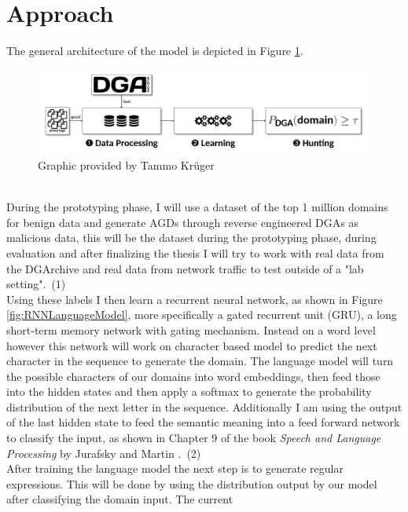 \documentclass[a4paper, 12pt]{article}
\begin{document}
\section{Approach}
The general architecture of the model is depicted in Figure \ref{fig:architecture}. 
\begin{figure}[h]
    \includegraphics[width=\textwidth]{images/DGA_Detect_Architecture.png}
    \caption{Graphic provided by Tammo Kr\"uger}
    \label{fig:architecture}
\end{figure}\\
During the prototyping phase, I will use a dataset of the top 1 million domains
\cite{noauthor_cisco_nodate} for benign data and
generate AGDs through reverse engineered DGAs \cite{bader_baderjdomain_generation_algorithms_2024}
as malicious data, this will be the dataset during the prototyping phase, during evaluation and
after finalizing the thesis I will try to work with real data from the
DGArchive \cite{dgarchive_2024} and real data from
network traffic to test outside of a "lab setting".~(1)\\
Using these labels I then learn a recurrent neural network, as shown in Figure \ref{fig:RNNLanguageModel},
more specifically a gated recurrent unit (GRU), a long short-term memory network with gating mechanism.
Instead on a word level however this network will work on character based model to predict the next
character in the sequence to generate the domain.
The language model will turn the possible characters of our domains into word embeddings, then feed
those into the hidden states and then apply a softmax to generate the probability distribution of
the next letter in the sequence.
Additionally I am using the output of the last hidden state to feed the semantic meaning into a feed
forward network to classify the input, as shown in Chapter 9 of the book \textit{Speech and Language
Processing} by Jurafsky and Martin \cite{jurafsky_speech_nodate}.~(2)\\ 
After training the language model the next step is to generate regular expressions. This will be
done by using the distribution output by our model after classifying the domain input. The current
\end{document}
